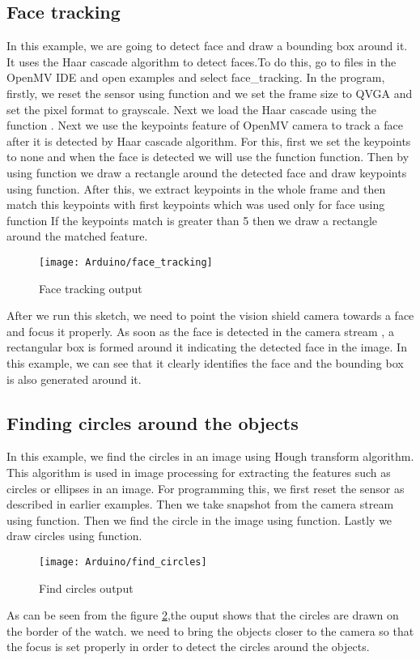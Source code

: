 \subsection{Face tracking }
In this example, we are going to detect face and draw a bounding box around it. It uses the Haar cascade algorithm to detect faces.To do this, go to files in the OpenMV IDE and open examples and select face\_tracking. In the program, firstly, we  reset the sensor using  function and we  set the frame size to QVGA and set the pixel format to grayscale. Next we  load the Haar cascade using the function  . Next we  use the keypoints feature of OpenMV camera to track a face after it is detected by Haar cascade algorithm. For this, first we set the keypoints to none and when the face is detected we will use the function  function. Then by using  function we draw a rectangle around the detected face and draw keypoints using  function. After this, we extract keypoints in the whole frame and then match this keypoints with first keypoints which was used only for face using  function If the keypoints match is greater than 5 then we draw a rectangle around the matched feature.
\begin{figure}[H]
	\centering
	\texttt{[image: Arduino/face\_tracking]}
	\caption{Face tracking output}
	\label{figure 6.11}
\end{figure}
After we run this sketch, we need to point the vision shield camera towards a face and focus it properly. As soon as the face is detected in the camera stream , a rectangular box is formed around it indicating the detected face in the image. In this example, we can see that it clearly identifies the face and the bounding box is also generated around it.
\subsection{Finding circles around the objects}
In this example, we find the circles in an image using Hough transform algorithm. This algorithm is used in image processing for extracting the features such as circles or ellipses in an image.  For programming this,  we first reset the sensor as described in earlier examples. Then we take snapshot from the camera stream using  function. Then we find the circle in the image using   function. Lastly  we draw circles using  function.
\begin{figure}[H]
	\centering
	\texttt{[image: Arduino/find\_circles]}
	\caption{Find circles output}
	\label{figure 6.12}
\end{figure}
As can be seen from the figure \ref{figure 6.12},the ouput shows that the circles are drawn on the border of the watch. we need to bring the objects closer to the camera so that the focus is set properly in order to detect the circles around the objects.  
